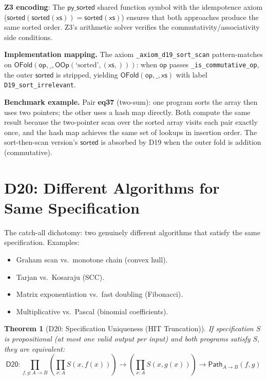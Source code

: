\documentclass[11pt,a4paper]{report}
\theoremstyle{definition}
\theoremstyle{plain}
\newtheorem{theorem}[definition]{Theorem}
\newcommand{\Path}{\mathsf{Path}}
\newcommand{\op}{\mathsf{op}}
\begin{document}
\textbf{Z3 encoding}: The $\mathsf{py\_sorted}$ shared function
symbol with the idempotence axiom ($\mathsf{sorted}(\mathsf{sorted}
(\mathsf{xs})) = \mathsf{sorted}(\mathsf{xs})$) ensures that both
approaches produce the same sorted order.  Z3's arithmetic solver
verifies the commutativity/associativity side conditions.

\textbf{Implementation mapping.}
The axiom \texttt{\_axiom\_d19\_sort\_scan} pattern-matches on
$\mathsf{OFold}(\op, \_, \mathsf{OOp}(\text{`sorted'}, (\mathsf{xs},)))$:
when $\op$ passes \texttt{\_is\_commutative\_op}, the outer
$\mathsf{sorted}$ is stripped, yielding
$\mathsf{OFold}(\op, \_, \mathsf{xs})$ with label
\texttt{D19\_sort\_irrelevant}.

\textbf{Benchmark example.}
Pair \textbf{eq37} (two-sum): one program sorts the array then uses
two pointers; the other uses a hash map directly.  Both compute the
same result because the two-pointer scan over the sorted array visits
each pair exactly once, and the hash map achieves the same set of
lookups in insertion order.  The sort-then-scan version's
$\mathsf{sorted}$ is absorbed by D19 when the outer fold is
addition (commutative).

\section{D20: Different Algorithms for Same Specification}
\label{sec:d20-spec}

The catch-all dichotomy: two genuinely different algorithms that
satisfy the same specification.  Examples:
\begin{itemize}
  \item Graham scan vs.\ monotone chain (convex hull).
  \item Tarjan vs.\ Kosaraju (SCC).
  \item Matrix exponentiation vs.\ fast doubling (Fibonacci).
  \item Multiplicative vs.\ Pascal (binomial coefficients).
\end{itemize}

\begin{theorem}[D20: Specification Uniqueness (HIT Truncation)]
\label{thm:d20-spec}
If specification $S$ is propositional (at most one valid output per
input) and both programs satisfy $S$, they are equivalent:
\[
  \mathsf{D20} : \prod_{f,g : A \to B}
  \left(\prod_{x:A} S(x, f(x))\right) \to
  \left(\prod_{x:A} S(x, g(x))\right) \to
  \Path_{A \to B}(f, g)
\]
\end{theorem}
\end{document}
